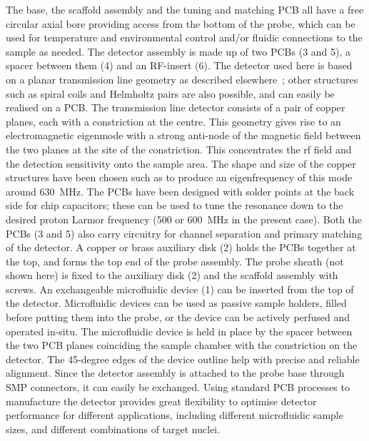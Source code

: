 \documentclass[preprint,12pt]{article}
\begin{document}
The base, the scaffold assembly and the tuning and matching PCB all have a free circular 
axial bore providing access from the bottom of the probe, which can be used for 
temperature and environmental control and/or fluidic connections to the sample as
needed.
The detector assembly is made up of two PCBs (3 and 5), a spacer between them (4) and an 
RF-insert (6). The detector used here is based on a planar transmission line geometry 
as described elsewhere~\cite{gream_2016,stripline_jan}; other structures such as spiral
coils and Helmholtz pairs are also possible, and can easily be realised on a PCB.
The transmission line detector consists of a pair of copper 
planes, each with a constriction at the centre.  This geometry gives rise to an 
electromagnetic eigenmode with a strong anti-node of the magnetic field between
the two planes at the site of the constriction. This concentrates the rf field 
and the detection sensitivity
onto the sample area. 
The shape and size of the copper structures have been chosen such as to produce
an eigenfrequency of this mode around 630~MHz. The PCBs have been designed with
solder points at the back side for chip capacitors; these can be used to tune the
resonance down to the desired proton Larmor frequency (500 or 600~MHz in the present case).
Both the PCBs (3 and 5) also carry circuitry for channel separation and primary 
matching of the detector. A copper or brass auxiliary disk (2) holds the PCBs 
together at the top, and forms the top end of the probe assembly.
The probe sheath (not shown here) is fixed to the auxiliary disk (2) 
and the scaffold assembly with screws. 
An exchangeable microfluidic device (1) can be inserted from the top of the detector. 
Microfluidic devices can be used as passive sample holders, filled before putting them
into the probe,
or the device can be actively perfused and operated in-situ. 
The microfluidic device is held in place by the spacer 
between the two PCB planes coinciding the sample chamber with the constriction on the 
detector.  The 45-degree edges of the device outline help with precise and reliable
alignment. 
Since the detector assembly is attached to the probe base through SMP 
connectors, it can easily be exchanged. 
Using standard PCB processes to manufacture the detector provides great flexibility
to optimise detector performance for different applications, including different
microfluidic sample sizes, and different combinations of target nuclei.
\par
\end{document}
